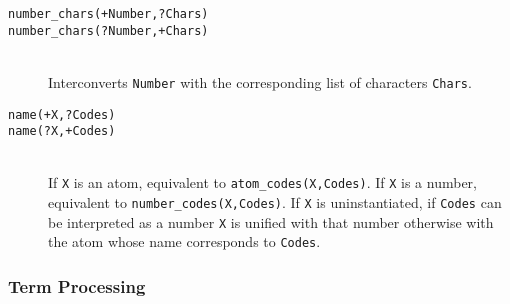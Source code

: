\begin{description}
\item [{\tt number\_chars(+Number,?Chars)}]
\item [{\tt number\_chars(?Number,+Chars)}]~\\
	Interconverts {\tt Number} with the corresponding list of
	characters {\tt Chars}.

\item [{\tt name(+X,?Codes)}]
\item [{\tt name(?X,+Codes)}]~\\
	If {\tt X} is an atom,  equivalent to {\tt atom\_codes(X,Codes)}.
	If {\tt X} is a number, equivalent to {\tt number\_codes(X,Codes)}.
	If {\tt X} is uninstantiated, if {\tt Codes} can be
	interpreted as a number {\tt X} is unified with that number
	otherwise with the atom whose name corresponds to {\tt Codes}.


\end{description}






\subsubsection{Term Processing}

